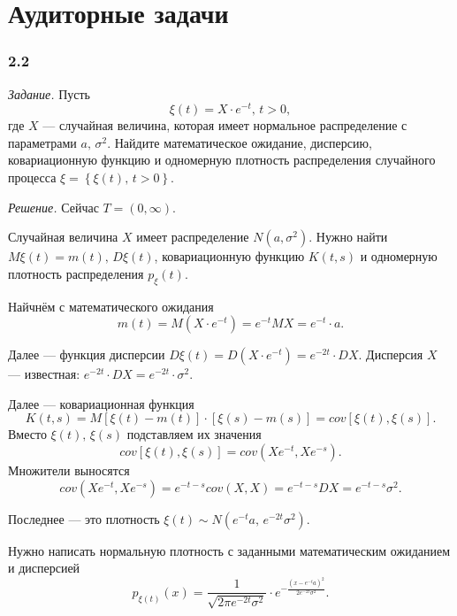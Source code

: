 \section*{Аудиторные задачи}

\subsubsection*{2.2}

\textit{Задание.}
Пусть
$$ \xi \left( t \right) =
  X \cdot e^{-t}, \,
  t > 0,$$
где $X$ --- случайная величина,
которая имеет нормальное распределение с параметрами $a, \, \sigma^2$.
Найдите математическое ожидание, дисперсию,
ковариационную функцию и одномерную плотность распределения случайного процесса
$ \xi =
  \left\{ \xi \left( t \right), \, t > 0 \right\} $.

\textit{Решение.}
Сейчас $T = \left( 0, \infty \right) $.

Случайная величина $X$ имеет распределение $N \left( a, \sigma^2 \right) $.
Нужно найти $M \xi \left( t \right) = m \left( t \right), \, D \xi \left( t \right) $,
ковариационную функцию $K \left( t, s \right) $ и одномерную плотность распределения
$p_{ \xi } \left( t \right) $.

Найчнём с математического ожидания
$$m \left( t \right) =
  M \left( X \cdot e^{-t} \right) =
  e^{-t} MX =
  e^{-t} \cdot a.$$

Далее ---
функция дисперсии $D \xi \left( t \right) = D \left( X \cdot e^{-t} \right) = e^{-2t} \cdot DX$.
Дисперсия $X$ --- известная: $e^{-2t} \cdot DX = e^{-2t} \cdot \sigma^2$.

Далее ---
ковариационная функция
$$K \left( t, s \right) =
  M \left[ \xi \left( t \right) - m \left( t \right) \right] \cdot
  \left[ \xi \left( s \right) - m \left( s \right) \right] =
  cov \left[ \xi \left( t \right), \xi \left( s \right) \right].$$
Вместо $ \xi \left( t \right), \, \xi \left( s \right) $ подставляем их значения
$$cov \left[ \xi \left( t \right), \xi \left( s \right) \right] =
  cov \left( Xe^{-t}, Xe^{-s} \right).$$
Множители выносятся
$$cov \left( Xe^{-t}, Xe^{-s} \right) =
  e^{-t - s} cov \left( X, X \right) =
  e^{-t - s} DX =
  e^{-t - s} \sigma^2.$$

Последнее ---
это плотность $ \xi \left( t \right) \sim N \left( e^{-t} a, \, e^{-2t} \sigma^2 \right) $.

Нужно написать нормальную плотность с заданными математическим ожиданием и дисперсией
$$p_{ \xi \left( t \right) } \left( x \right) =
  \frac{1}{ \sqrt{2 \pi e^{-2t} \sigma^2}} \cdot
  e^{- \frac{ \left( x - e^{-t} a \right)^2}{2e^{-2t} \sigma^2}}.$$

